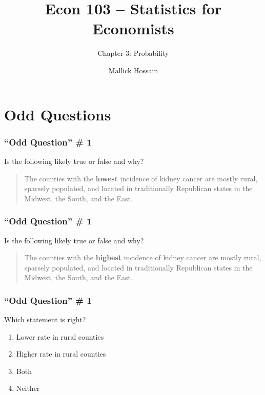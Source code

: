 \documentclass{beamer}
\title{Econ 103 -- Statistics for Economists}
\subtitle{Chapter 3: Probability}
\author{Mallick Hossain}
\date{}
\institute{University of Pennsylvania}
\begin{document}
 

\begin{frame}
	\titlepage 
\end{frame} 

\section{Odd Questions}
\begin{frame}
\frametitle{``Odd Question'' \# 1}
	Is the following likely true or false and why? 
	\begin{quote}
	    The counties with the \textbf{lowest} incidence of kidney cancer are mostly rural, sparsely 
	    populated, and located in traditionally Republican states in the Midwest, the South, and the 
	    East. 
	\end{quote}
\end{frame}

\begin{frame}
\frametitle{``Odd Question'' \# 1}
	Is the following likely true or false and why? 
	\begin{quote}
	    The counties with the \textbf{highest} incidence of kidney cancer are mostly rural, sparsely 
	    populated, and located in traditionally Republican states in the Midwest, the South, and the 
	    East. 
	\end{quote}
\end{frame}

\begin{frame}
\frametitle{``Odd Question'' \# 1}
    Which statement is right?    
    \begin{enumerate}
        \item Lower rate in rural counties
        \item Higher rate in rural counties
        \item \alert<2->{Both}
        \item Neither
    \end{enumerate}
\end{frame}
\end{document}
